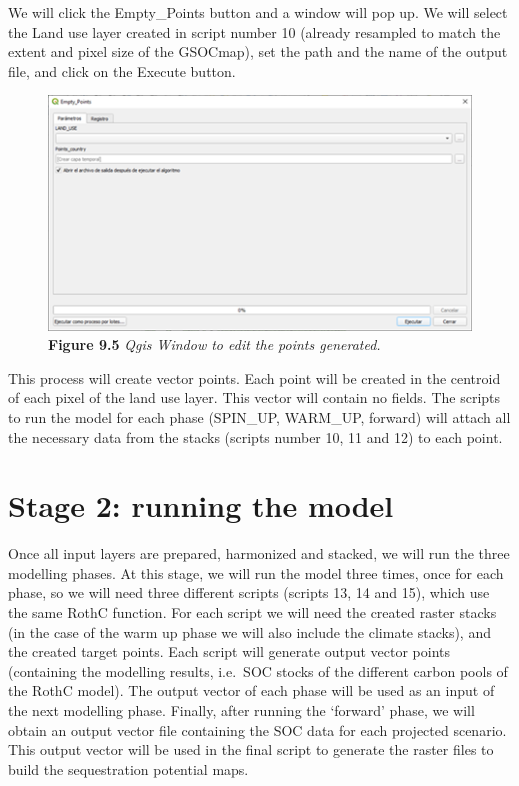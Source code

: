 \documentclass[
  10pt,
  b5paper,
]{book}
\begin{document}
We will click the Empty\_Points button and a window will pop up. We will select the Land use layer created in script number 10 (already resampled to match the extent and pixel size of the GSOCmap), set the path and the name of the output file, and click on the Execute button.

\begin{figure}
\centering
\includegraphics{images/Figure_9.5.png}
\caption{\textbf{Figure 9.5} \emph{Qgis Window to edit the points generated.}}
\end{figure}

This process will create vector points. Each point will be created in the centroid of each pixel of the land use layer. This vector will contain no fields. The scripts to run the model for each phase (SPIN\_UP, WARM\_UP, forward) will attach all the necessary data from the stacks (scripts number 10, 11 and 12) to each point.

\hypertarget{stage-2-running-the-model}{%
\chapter{\textbar{} Stage 2: running the model}\label{stage-2-running-the-model}}

Once all input layers are prepared, harmonized and stacked, we will run the three modelling phases. At this stage, we will run the model three times, once for each phase, so we will need three different scripts (scripts 13, 14 and 15), which use the same RothC function. For each script we will need the created raster stacks (in the case of the warm up phase we will also include the climate stacks), and the created target points. Each script will generate output vector points (containing the modelling results, i.e.~SOC stocks of the different carbon pools of the RothC model). The output vector of each phase will be used as an input of the next modelling phase. Finally, after running the `forward' phase, we will obtain an output vector file containing the SOC data for each projected scenario. This output vector will be used in the final script to generate the raster files to build the sequestration potential maps.
\end{document}
